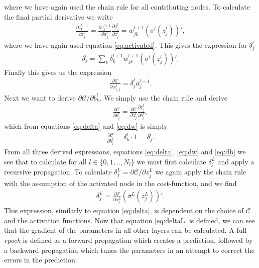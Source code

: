 where we have again used the chain rule for all contributing nodes. To calculate the final partial derivative we write
\begin{align*}
    \frac{\partial z_k^{l+1}}{\partial z^l_j} = \frac{\partial z_k^{l+1}}{\partial a^l_j}\frac{\partial a^l_j}{\partial z^l_j}
                                              = w_{jk}^{l+1}(\sigma^l(z_j^l))',
\end{align*}
where we have again used equation \ref{eq:activated}. This gives the expression for $\delta_j^l$
\begin{align}\label{eq:delta}
    \delta_j^l  = \sum_k \delta_k^{l+1}w_{jk}^{l+1}(\sigma^l(z_j^l))'.  
\end{align}
Finally this gives us the expression
\begin{align}\label{eq:dw}
    \frac{\partial \mathcal{C}}{\partial w_{i,j}^l} = \delta_j^{l} a_j^{l-1}.
\end{align}
Next we want to derive $\partial \mathcal{C}/\partial b^l_k$. We simply use the chain rule and derive
\begin{align*}
    \frac{\partial \mathcal{C}}{\partial b^l_j} = \frac{\partial \mathcal{C}}{\partial z^l_j}\frac{\partial z_j^l}{\partial b^l_j},
\end{align*}
which from equations \ref{eq:delta} and \ref{eq:dw} is simply
\begin{align}\label{eq:db}
    \frac{\partial \mathcal{C}}{\partial b^l_j} = \delta_k^{l} \cdot 1 = \delta_j^{l}.
\end{align}
From all three derived expressions, equations \ref{eq:delta}, \ref{eq:dw} and \ref{eq:db} we see that 
to calculate for all $l\in\{0,1,..,N_l\}$ we must first calculate $\delta_j^L$ and apply a recursive propagation.
To calculate $\delta_j^L = \partial \mathcal{C}/\partial z^L_j$ we again apply the chain rule with the assumption of the activated 
node in the cost-function, and we find
\begin{align}\label{eq:deltaL}
    \delta_j^L = \frac{\partial \mathcal{C}}{\partial a^L_j}\left(\sigma^L(z_j^L)\right)'.
\end{align}
This expression, similarly to equation \ref{eq:delta}, is dependent on the choice of $\mathcal{C}$ and 
the activation functions. Now that equation \ref{eq:deltaL} is defined, we can see that the
gradient of the parameters in all other layers can be calculated. A full \emph{epoch} is defined as 
a forward propagation which creates a prediction, followed by a backward propagation which tunes the parameters 
in an attempt to correct the errors in the prediction.

